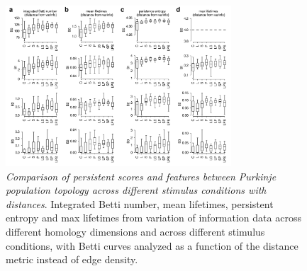 \begin{figure}[H]
    \centering
    \includegraphics[width=0.75\textwidth,center]{../figures/report/Fig6.png}
    \caption{\label{fig:6}
    \textit{Comparison of persistent scores and features between Purkinje population topology across different stimulus conditions with distances}.
    Integrated Betti number, mean lifetimes, persistent entropy and max lifetimes from variation of information data across different homology dimensions and across different stimulus conditions, with Betti curves analyzed as a function of the distance metric instead of edge density.
    }
\end{figure}